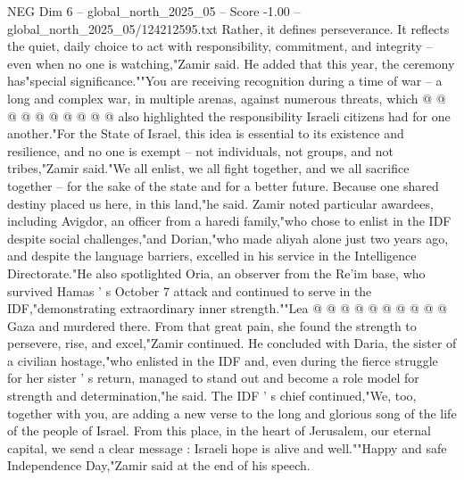 \begin{textsample}{NEG Dim 6 – global\_north\_2025\_05 – Score -1.00 – global\_north\_2025\_05/124212595.txt}
Rather, it defines perseverance.
It reflects the quiet, daily choice to act with responsibility, commitment, and integrity -- even when no one is watching,"Zamir said.
He added that this year, the ceremony has"special significance.""You are receiving recognition during a time of war -- a long and complex war, in multiple arenas, against numerous threats, which @ @ @ @ @ @ @ @ @ @ also highlighted the responsibility Israeli citizens had for one another."For the State of Israel, this idea is essential to its existence and resilience, and no one is exempt -- not individuals, not groups, and not tribes,"Zamir said."We all enlist, we all fight together, and we all sacrifice together -- for the sake of the state and for a better future.
Because one shared destiny placed us here, in this land,"he said.
Zamir noted particular awardees, including Avigdor, an officer from a haredi family,"who chose to enlist in the IDF despite social challenges,"and Dorian,"who made aliyah alone just two years ago, and despite the language barriers, excelled in his service in the Intelligence Directorate."He also spotlighted Oria, an observer from the Re'im base, who survived Hamas ' s October 7 attack and continued to serve in the IDF,"demonstrating extraordinary inner strength.""Lea @ @ @ @ @ @ @ @ @ @ Gaza and murdered there.
From that great pain, she found the strength to persevere, rise, and excel,"Zamir continued.
He concluded with Daria, the sister of a civilian hostage,"who enlisted in the IDF and, even during the fierce struggle for her sister ' s return, managed to stand out and become a role model for strength and determination,"he said.
The IDF ' s chief continued,"We, too, together with you, are adding a new verse to the long and glorious song of the life of the people of Israel.
From this place, in the heart of Jerusalem, our eternal capital, we send a clear message : Israeli hope is alive and well.""Happy and safe Independence Day,"Zamir said at the end of his speech.

\end{textsample}

